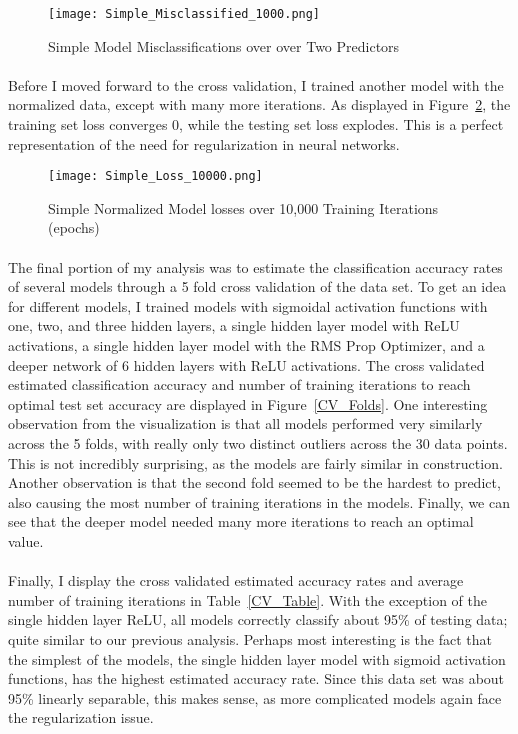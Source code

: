 \documentclass[11pt]{scrartcl} %
\begin{document}
\begin{figure}[h]
	\centering
	\texttt{[image: Simple\_Misclassified\_1000.png]}
	\caption{Simple Model Misclassifications over over Two Predictors}
	\label{Simple_Model_Misclassifications}
\end{figure}


\paragraph{}
Before I moved forward to the cross validation, I trained another model with the normalized data, except with many more iterations. As displayed in Figure~\ref{Overtrained_Normalized_Model}, the training set loss converges 0, while the testing set loss explodes. This is a perfect representation of the need for regularization in neural networks.
\begin{figure}[h]
	\centering
	\texttt{[image: Simple\_Loss\_10000.png]}
	\caption{Simple Normalized Model losses over 10,000 Training Iterations (epochs)}
	\label{Overtrained_Normalized_Model}
\end{figure}

\paragraph{}
The final portion of my analysis was to estimate the classification accuracy rates of several models through a 5 fold cross validation of the data set. To get an idea for different models, I trained models with sigmoidal activation functions with one, two, and three hidden layers, a single hidden layer model with ReLU activations, a single hidden layer model with the RMS Prop Optimizer, and a deeper network of 6 hidden layers with ReLU activations. The cross validated estimated classification accuracy and number of training iterations to reach optimal test set accuracy are displayed in Figure~\ref{CV_Folds}. One interesting observation from the visualization is that all models performed very similarly across the 5 folds, with really only two distinct outliers across the 30 data points. This is not incredibly surprising, as the models are fairly similar in construction. Another observation is that the second fold seemed to be the hardest to predict, also causing the most number of training iterations in the models. Finally, we can see that the deeper model needed many more iterations to reach an optimal value.

\paragraph{}
Finally, I display the cross validated estimated accuracy rates and average number of training iterations in Table~\ref{CV_Table}. With the exception of the single hidden layer ReLU, all models correctly classify about 95\% of testing data; quite similar to our previous analysis. Perhaps most interesting is the fact that the simplest of the models, the single hidden layer model with sigmoid activation functions, has the highest estimated accuracy rate. Since this data set was about 95\% linearly separable, this makes sense, as more complicated models again face the regularization issue.
\end{document}
